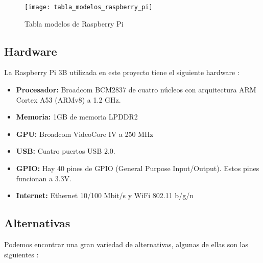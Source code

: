             \begin{figure}[ht]
                \centering
                \texttt{[image: tabla\_modelos\_raspberry\_pi]}
                \caption{Tabla modelos de Raspberry Pi \cite{raspberry_pi_wikipedia_en}\label{fig:ImagenModelosPi}}
            \end{figure}

            \newpage


        \subsection{Hardware} %
        \label{sub:HardwareRaspberryPi}

            La Raspberry Pi 3B utilizada en este proyecto tiene el siguiente hardware \cite{raspberry_pi_hardware}:

            \begin{itemize}
                \item \textbf{Procesador:} Broadcom BCM2837 de cuatro núcleos con arquitectura ARM Cortex A53 (ARMv8) a
                1.2 GHz.
                \item \textbf{Memoria:} 1GB de memoria LPDDR2
                \item \textbf{GPU:} Broadcom VideoCore IV a 250 MHz
                \item \textbf{USB:} Cuatro puertos USB 2.0.
                \item \textbf{GPIO:} Hay 40 pines de GPIO (General Purpose Input/Output). Estos pines funcionan a 3.3V.
                \item \textbf{Internet:} Ethernet 10/100 Mbit/s y WiFi 802.11 b/g/n
            \end{itemize}


        \subsection{Alternativas} %
        \label{sub:AlternativasRaspberryPi}

            Podemos encontrar una gran variedad de alternativas, algunas de ellas son las
            siguientes \cite{alternativas_raspberry_pi}:

